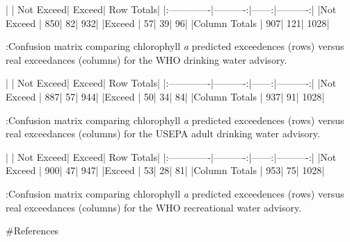 \newpage


|              | Not Exceed| Exceed| Row Totals|
|:-------------|----------:|------:|----------:|
|Not Exceed    |        850|     82|        932|
|Exceed        |         57|     39|         96|
|Column Totals |        907|    121|       1028|



:Confusion matrix comparing chlorophyll \textit{a} predicted exceedences (rows) versus real exceedances (columns) for the WHO drinking water advisory. \label{tab:who_drink_conmat_table}

\newpage


|              | Not Exceed| Exceed| Row Totals|
|:-------------|----------:|------:|----------:|
|Not Exceed    |        887|     57|        944|
|Exceed        |         50|     34|         84|
|Column Totals |        937|     91|       1028|



:Confusion matrix comparing chlorophyll \textit{a} predicted exceedences (rows) versus real exceedances (columns) for the USEPA adult drinking water advisory. \label{tab:adult_conmat_table}

\newpage


|              | Not Exceed| Exceed| Row Totals|
|:-------------|----------:|------:|----------:|
|Not Exceed    |        900|     47|        947|
|Exceed        |         53|     28|         81|
|Column Totals |        953|     75|       1028|



:Confusion matrix comparing chlorophyll \textit{a} predicted exceedences (rows) versus real exceedances (columns) for the WHO recreational water advisory. \label{tab:who_rec_conmat_table}

\newpage

#References
